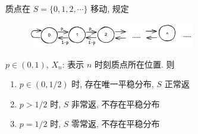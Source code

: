 \begin{example}
    质点在 $S=\{0,1,2,\cdots\}$ 移动, 规定
    \begin{figure}[H]
        \centering
        \includegraphics[width=0.65\textwidth]{figures/g_birth_death.png}
    \end{figure}
    $p\in (0,1)$, $X_n$: 表示 $n$ 时刻质点所在位置. 则
    \begin{enumerate}
        \item $p\in (0,1/2)$ 时, 存在唯一平稳分布, $S$ 正常返
        \item $p>1/2$ 时, $S$ 非常返, 不存在平稳分布
        \item $p=1/2$ 时, $S$ 零常返, 不存在平稳分布
    \end{enumerate}
\end{example}

